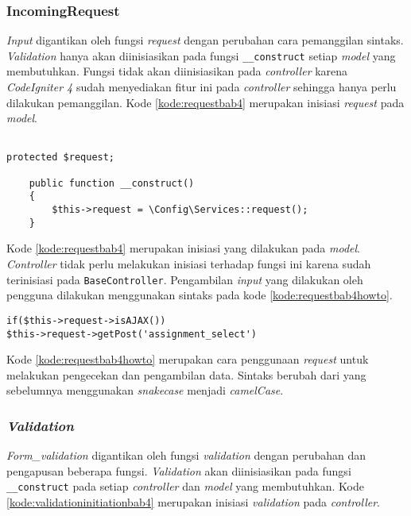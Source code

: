 \subsubsection{IncomingRequest}
\textit{Input} digantikan oleh fungsi \textit{request} dengan perubahan cara pemanggilan sintaks. \textit{Validation} hanya akan diinisiasikan pada fungsi \texttt{\_\_construct} setiap \textit{model} yang membutuhkan. Fungsi tidak akan diinisiasikan pada \textit{controller} karena \textit{CodeIgniter 4} sudah menyediakan fitur ini pada \textit{controller} sehingga hanya perlu dilakukan pemanggilan. Kode \ref{kode:requestbab4} merupakan inisiasi \textit{request} pada \textit{model}.

\begin{lstlisting}[caption=Perancangan inisiasi \textit{request} pada \texttt{\_\_construct}, label=kode:requestbab4]

protected $request;

	public function __construct()
	{
		$this->request = \Config\Services::request(); 
	}
\end{lstlisting}

Kode \ref{kode:requestbab4} merupakan inisiasi yang dilakukan pada \textit{model}. \textit{Controller} tidak perlu melakukan inisiasi terhadap fungsi ini karena sudah terinisiasi pada \texttt{BaseController}. Pengambilan \textit{input} yang dilakukan oleh pengguna dilakukan menggunakan sintaks pada kode \ref{kode:requestbab4howto}.

\begin{lstlisting}[caption=Perancangan penggunaan \textit{request}, label=kode:requestbab4howto]
if($this->request->isAJAX())
$this->request->getPost('assignment_select')
\end{lstlisting}

Kode \ref{kode:requestbab4howto} merupakan cara penggunaan \textit{request} untuk melakukan pengecekan dan pengambilan data. Sintaks berubah dari yang sebelumnya menggunakan \textit{snakecase} menjadi \textit{camelCase}.

\subsubsection{\textit{Validation}}
\textit{Form\_validation} digantikan oleh fungsi \textit{validation} dengan perubahan dan pengapusan beberapa fungsi. \textit{Validation} akan diinisiasikan pada fungsi \texttt{\_\_construct} pada setiap \textit{controller} dan \textit{model} yang membutuhkan. Kode \ref{kode:validationinitiationbab4} merupakan inisiasi \textit{validation} pada \textit{controller}.

